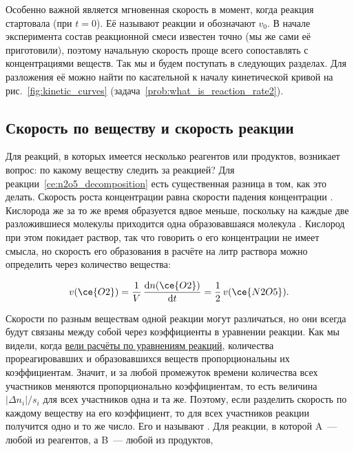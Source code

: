 Особенно важной является мгновенная скорость в момент, когда реакция стартовала (при $t = 0$). Её называют  реакции и обозначают $v_0$. В начале эксперимента состав реакционной смеси известен точно (мы же сами её приготовили), поэтому начальную скорость проще всего сопоставлять с концентрациями веществ. Так мы и будем поступать в следующих разделах. Для разложения  её можно найти по касательной к началу кинетической кривой на рис.~\ref{fig:kinetic_curves} (задача~\ref{prob:what_is_reaction_rate2}).

\subsection*{Скорость по веществу и скорость реакции}

Для реакций, в которых имеется несколько реагентов или продуктов, возникает вопрос: по какому веществу следить за реакцией? Для реакции~\eqref{ce:n2o5_decomposition} есть существенная разница в том, как это делать. Скорость роста концентрации  равна скорости падения концентрации . Кислорода же за то же время образуется вдвое меньше, поскольку на каждые две разложившиеся молекулы  приходится одна образовавшаяся молекула . Кислород при этом покидает раствор, так что говорить о его концентрации не имеет смысла, но скорость его образования в расчёте на литр раствора можно определить через количество вещества:

\begin{equation*}
    v(\ce{O2}) = \frac{1}{V}\,\frac{\mathrm{d}n(\ce{O2})}{\mathrm{d}t} = \frac{1}{2}\,v(\ce{N2O5}).
\end{equation*}

Скорости по разным веществам одной реакции могут различаться, но они всегда будут связаны между собой через коэффициенты в уравнении реакции. Как мы видели, когда \hyperref[sec:calculations_based_on_chemical_equations]{вели расчёты по уравнениям реакций}, количества прореагировавших и образовавшихся веществ пропорциональны их коэффициентам. Значит, и за любой промежуток времени количества всех участников меняются пропорционально коэффициентам, то есть величина $|\Delta n_i|/s_i$ для всех участников одна и та же. Поэтому, если разделить скорость по каждому веществу на его коэффициент, то для всех участников реакции получится одно и то же число. Его и называют . Для реакции, в которой A~--- любой из реагентов, а B~--- любой из продуктов,

